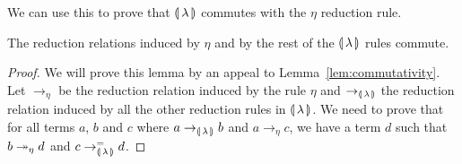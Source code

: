 We can use this to prove that $\llparenthesis \, \lambda \, \rrparenthesis$ commutes with the
$\eta$ reduction rule.

\begin{lemma}\label{lem:eta-commutes}

  The reduction relations induced by $\eta$ and by the rest of the
  $\llparenthesis \, \lambda \, \rrparenthesis$ rules commute.
\end{lemma}

\begin{proof}
  We will prove this lemma by an appeal to
  Lemma~\ref{lem:commutativity}. Let $\to_\eta$ be the reduction relation
  induced by the rule $\eta$ and $\to_{\llparenthesis \, \lambda \, \rrparenthesis}$ the reduction
  relation induced by all the other reduction rules in
  $\llparenthesis \, \lambda \, \rrparenthesis$. We need to prove that for all terms $a$, $b$ and $c$
  where $a \to_{\llparenthesis \, \lambda \, \rrparenthesis} b$ and $a \to_\eta c$, we have a term $d$ such that
  $b \twoheadrightarrow_\eta d$ and $c \to_{\llparenthesis \, \lambda \, \rrparenthesis}^= d$.


\end{proof}
